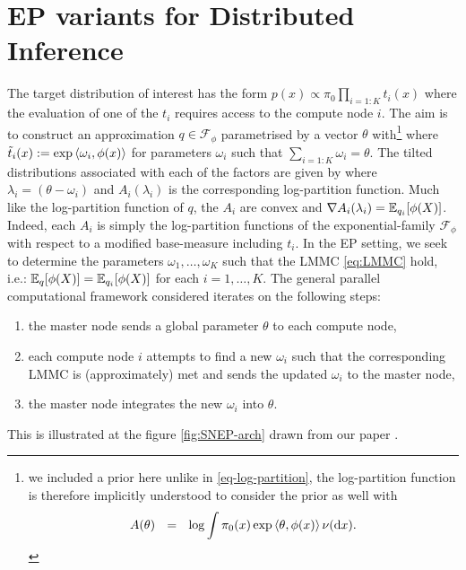 \section{\label{sec:ep-for-dbi}EP variants for Distributed Inference}
The target distribution of interest has the form $p(x)\propto \pi_0\prod_{i=1:K}t_i(x)$ where the evaluation of one of the $t_i$ requires access to the compute node $i$. The aim is to construct an approximation $q\in\mathcal F_\phi$ parametrised by a vector $\theta$ with\footnote{we included a prior here unlike in \eqref{eq-log-partition}, the log-partition function is therefore implicitly understood to consider the prior as well with
$$
	A(\theta) \quad\!\!=\quad\!\! \log \int \pi_{0}(x)\exp\left\langle \theta,\phi(x) \right\rangle\nu(\!\,\mathrm{d} x)
.
$$}
%
%
where $\tilde t_i(x):=\exp\left\langle \omega_i,\phi(x) \right\rangle$ for parameters $\omega_{i}$ such that $\sum_{i=1:K}\omega_i=\theta$. The tilted distributions associated with each of the factors are given by
%
% 
where $\lambda_i=(\theta-\omega_i)$ and $A_i(\lambda_i)$ is the corresponding log-partition function. Much like the log-partition function of $q$, the $A_i$ are convex and $\nabla A_i(\lambda_i)=\mathbb E_{q_i}[\phi(X)]$. Indeed, each $A_i$ is simply the log-partition functions of the exponential-family $\mathcal F_\phi$ with respect to a modified base-measure including $t_i$.
In the EP setting, we seek to determine the parameters $\omega_1,\dots,\omega_K$ such that the LMMC \eqref{eq:LMMC} hold, i.e.: $\mathbb E_q[\phi(X)]=\mathbb E_{q_i}[\phi(X)]$ for each $i=1,\dots,K$.
The general parallel computational framework considered iterates on the following steps:
\begin{enumerate}\itsepa
	\item the master node sends a global parameter $\theta$ to each compute node,
	\item each compute node $i$ attempts to find a new $\omega_i$ such that the corresponding LMMC is (approximately) met and sends the updated $\omega_i$ to the master node,
	\item the master node integrates the new $\omega_i$ into $\theta$.
\end{enumerate} 

\noindent This is illustrated at the figure \ref{fig:SNEP-arch} drawn from our paper \citep{hasenclever16}.

